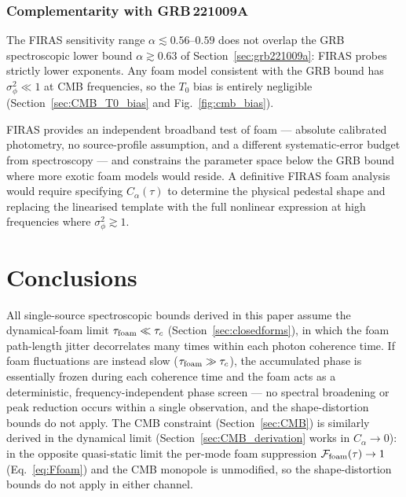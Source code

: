 \documentclass[aps,prd,onecolumn,amsmath,amssymb]{revtex4-2}
\begin{document}
\subsubsection{Complementarity with GRB\,221009A}
\label{sec:CMB_complementarity}

The FIRAS sensitivity range $\alpha\lesssim 0.56$--$0.59$ does not
overlap the GRB spectroscopic lower bound $\alpha\gtrsim 0.63$ of
Section~\ref{sec:grb221009a}: FIRAS probes strictly lower exponents.
Any foam model consistent with the GRB bound has $\sigma_\phi^2\ll 1$
at CMB frequencies, so the $T_0$ bias is entirely negligible
(Section~\ref{sec:CMB_T0_bias} and Fig.~\ref{fig:cmb_bias}).

FIRAS provides an independent broadband test of foam --- absolute
calibrated photometry, no source-profile assumption, and a different
systematic-error budget from spectroscopy --- and constrains the
parameter space below the GRB bound where more exotic foam models
would reside.  A definitive FIRAS foam analysis would require
specifying $C_\alpha(\tau)$ to determine the physical pedestal shape
and replacing the linearised template with the full nonlinear
expression at high frequencies where $\sigma_\phi^2\gtrsim 1$.

\section{Conclusions}
\label{sec:conclusions}

All single-source spectroscopic bounds derived in this paper assume the
dynamical-foam limit $\tau_{\rm foam}\ll\tau_c$
(Section~\ref{sec:closedforms}), in which the foam path-length jitter
decorrelates many times within each photon coherence time.  If foam
fluctuations are instead slow ($\tau_{\rm foam}\gg\tau_c$), the
accumulated phase is essentially frozen during each coherence time and
the foam acts as a deterministic, frequency-independent phase screen
--- no spectral broadening or peak reduction occurs within a single
observation, and the shape-distortion bounds do not apply.  The CMB
constraint (Section~\ref{sec:CMB}) is similarly derived in the
dynamical limit (Section~\ref{sec:CMB_derivation} works in
$C_\alpha\to 0$): in the opposite quasi-static limit the per-mode
foam suppression $\mathcal{F}_{\rm foam}(\tau)\to 1$
(Eq.~\eqref{eq:Ffoam}) and the CMB monopole is unmodified, so the
shape-distortion bounds do not apply in either channel.
\end{document}
